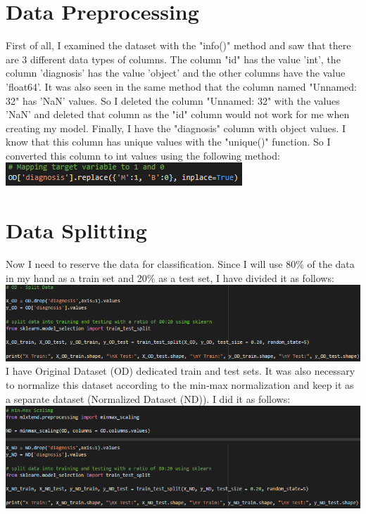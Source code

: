 \documentclass[a4 paper]{article}
\begin{document}
\section{Data Preprocessing}
    First of all, I examined the dataset with the "info()" method and saw that there are 3 different data types of columns. The column "id" has the value 'int', the column 'diagnosis' has the value 'object' and the other columns have the value 'float64'.
    \newline It was also seen in the same method that the column named "Unnamed: 32" has 'NaN' values.
    So I deleted the column "Unnamed: 32" with the values 'NaN' and deleted that column as the "id" column would not work for me when creating my model.
    \newline Finally, I have the "diagnosis" column with object values. I know that this column has unique values with the "unique()" function. So I converted this column to int values using the following method:
    \newline \includegraphics{object-to-int.png}

\section{Data Splitting}
    Now I need to reserve the data for classification. Since I will use 80\% of the data in my hand as a train set and 20\% as a test set, I have divided it as follows:
    \newline \includegraphics[scale=0.75]{OD-split.png}
    \newline I have Original Dataset (OD) dedicated train and test sets. It was also necessary to normalize this dataset according to the min-max normalization and keep it as a separate dataset (Normalized Dataset (ND)). I did it as follows:
    \newline \includegraphics[scale=0.75]{ND-split.png}
\end{document}
